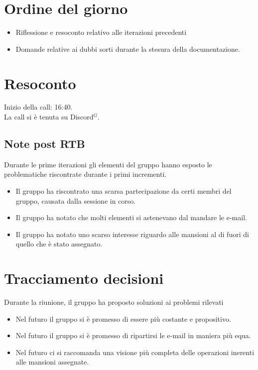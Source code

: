 \section{Ordine del giorno}

\begin{itemize}
	\item Riflessione e resoconto relativo alle iterazioni precedenti
	\item Domande relative ai dubbi sorti durante la stesura della documentazione.
\end{itemize}

\section{Resoconto}
\label{sec:Resoconto}

\noindent 
Inizio della call: 16:40. \\
\noindent La call si è tenuta su Discord$^{G}$.

\subsection{Note post RTB}
Durante le prime iterazioni gli elementi del gruppo hanno esposto le problematiche riscontrate durante i primi incrementi.
	\begin{itemize}
		\item Il gruppo ha riscontrato una scarsa partecipazione da certi membri del gruppo, causata dalla sessione in corso.
		\item Il gruppo ha notato che molti elementi si astenevano dal mandare le e-mail.
		\item Il gruppo ha notato uno scarso interesse riguardo alle mansioni al di fuori di quello 
		che è stato assegnato.
	\end{itemize}


\section{Tracciamento decisioni}
\noindent Durante la riunione, il gruppo ha proposto soluzioni ai problemi rilevati 
\begin{itemize}
	\item Nel futuro il gruppo si è promesso di essere più costante e propositivo.
	\item Nel futuro il gruppo si è promesso di ripartirsi le e-mail in maniera più equa.
	\item Nel futuro ci si raccomanda una visione più completa delle operazioni inerenti alle
	mansioni assegnate.
\end{itemize}

